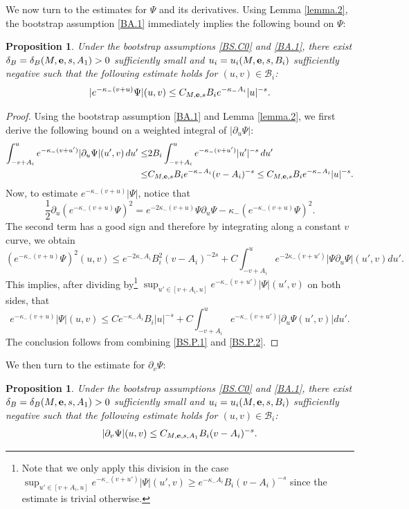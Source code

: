\documentclass[10pt, reqno]{amsart}
\newtheorem{proposition}[theorem]{Proposition}
\theoremstyle{definition}
\theoremstyle{remark}
\numberwithin{equation}{section}
\newcommand{\rd}{\partial}
\newcommand{\0}{\emptyset}
\newcommand{\f}{\frac}
\newcommand{\de}{\delta}
\begin{document}
We now turn to the estimates for $\Psi$ and its derivatives. Using Lemma \ref{lemma.2}, the bootstrap assumption \eqref{BA.1} immediately implies the following bound on $\Psi$:
\begin{proposition}\label{BS.P}
Under the bootstrap assumptions \eqref{BS.C0} and \eqref{BA.1}, there exist $\de_B=\de_B(M,{\bf e},s,A_1)>0$ sufficiently small and $u_i=u_i(M,{\bf e},s,B_i)$ sufficiently negative such that the following estimate holds for $(u,v)\in \mathcal B_i$:
$$|e^{-\kappa_-(v+u)}\Psi|(u,v)\leq C_{M,{\bf e},s} B_i e^{-\kappa_- A_i} |u|^{-s}.$$
\end{proposition}
\begin{proof}
Using the bootstrap assumption \eqref{BA.1} and Lemma \ref{lemma.2}, we first derive the following bound on a weighted integral of $|\rd_u\Psi|$:
\begin{equation}\label{BS.P.1}
\begin{split}
\int_{-v+A_i}^u e^{-\kappa_-(v+u')}|\rd_u\Psi|(u',v)\, du'\leq& 2 B_i\int_{-v+A_i}^u e^{-\kappa_-(v+u')}|u'|^{-s}\, du'\\
\leq & C_{M,{\bf e},s}B_i e^{-\kappa_- A_i} (v-A_i)^{-s}\leq C_{M,{\bf e},s}B_i e^{-\kappa_- A_i}|u|^{-s}.
\end{split}
\end{equation}
Now, to estimate $e^{-\kappa_-(v+u)}|\Psi|$, notice that
$$\f 12\rd_u(e^{-\kappa_-(v+u)}\Psi)^2=e^{-2\kappa_-(v+u)}\Psi\rd_u\Psi-\kappa_-(e^{-\kappa_- (v+u)}\Psi)^2.$$
The second term has a good sign and therefore by integrating along a constant $v$ curve, we obtain
$$(e^{-\kappa_-(v+u)}\Psi)^2 (u,v)\leq e^{-2\kappa_- A_i}B_i^2(v-A_i)^{-2s}+C\int_{-v+A_i}^u e^{-2\kappa_-(v+u')}|\Psi\rd_u\Psi | (u',v) du'.$$
This implies, after dividing by\footnote{Note that we only apply this division in the case $\sup_{u'\in [v+A_i,u]}e^{-\kappa_-(v+u')}|\Psi| (u',v)\geq e^{-\kappa_- A_i}B_i(v-A_i)^{-s}$ since the estimate is trivial otherwise.} $\sup_{u'\in [v+A_i,u]}e^{-\kappa_-(v+u')}|\Psi| (u',v)$ on both sides, that
\begin{equation}\label{BS.P.2}
e^{-\kappa_-(v+u)}|\Psi| (u,v)\leq Ce^{-\kappa_- A_i}B_i|u|^{-s}+C\int_{-v+A_i}^u e^{-\kappa_-(v+u')}|\rd_u\Psi(u',v)| du'.
\end{equation}
The conclusion follows from combining \eqref{BS.P.1} and \eqref{BS.P.2}.
\end{proof}
We then turn to the estimate for $\rd_v\Psi$:
\begin{proposition}\label{BS.rvP}
Under the bootstrap assumptions \eqref{BS.C0} and \eqref{BA.1}, there exist $\de_B=\de_B(M,{\bf e},s,A_1)>0$ sufficiently small and $u_i=u_i(M,{\bf e},s,B_i)$ sufficiently negative such that the following estimate holds for $(u,v)\in\mathcal B_i$:
$$|\rd_v\Psi|(u,v)\leq C_{M,{\bf e},s,A_1}B_i(v-A_i)^{-s}.$$
\end{proposition}
\end{document}
